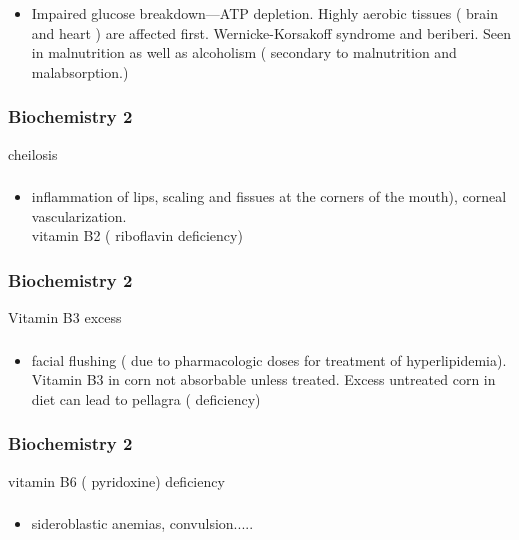 \documentclass[11pt]{beamer}
\begin{document}
\begin{frame}
 \frametitle{}
\begin{itemize}
\item Impaired glucose breakdown---ATP depletion. Highly aerobic tissues ( brain and heart ) are affected first. Wernicke-Korsakoff syndrome and beriberi. Seen in malnutrition as well as alcoholism ( secondary to malnutrition and malabsorption.) 
\end{itemize}
\end{frame}

\begin{frame}
 \frametitle{Biochemistry 2}
cheilosis 
\end{frame}

\begin{frame}
 \frametitle{}
\begin{itemize}
\item inflammation of lips, scaling and fissues at the corners of the mouth), corneal vascularization.  \\ vitamin B2 ( riboflavin deficiency) 
\end{itemize}
\end{frame}

\begin{frame}
 \frametitle{Biochemistry 2}
Vitamin B3 excess 
\end{frame}

\begin{frame}
 \frametitle{}
\begin{itemize}
\item facial flushing ( due to pharmacologic doses for treatment of hyperlipidemia). Vitamin B3 in corn not absorbable unless treated. Excess untreated corn in diet can lead to pellagra ( deficiency) 
\end{itemize}
\end{frame}

\begin{frame}
 \frametitle{Biochemistry 2}
vitamin B6 ( pyridoxine) deficiency 
\end{frame}

\begin{frame}
 \frametitle{}
\begin{itemize}
\item sideroblastic anemias, convulsion.....
\end{itemize}
\end{frame}
\end{document}
